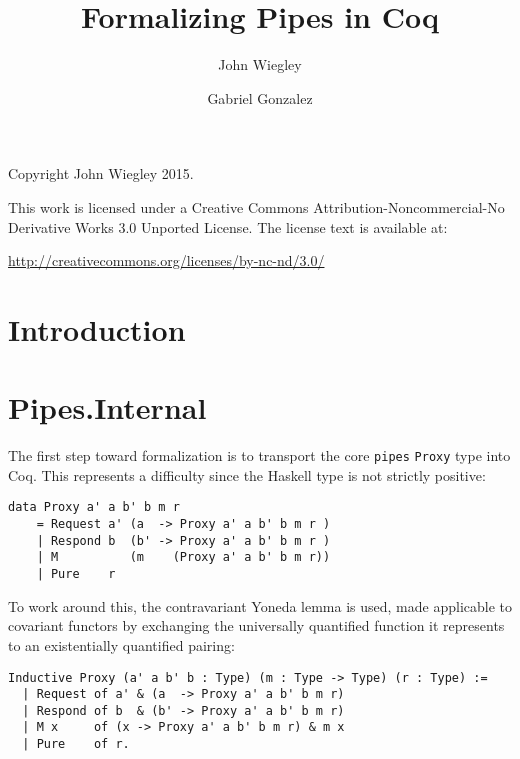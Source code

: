 \documentclass[12pt]{article}
\title{Formalizing Pipes in Coq}
\author{John Wiegley \and Gabriel Gonzalez}
\newcommand{\pipes}{\texttt{pipes}}
\begin{document}
\setlength{\parskip}{0.5ex}
\maketitle

\thispagestyle{empty}
\mbox{}\vfill
\begin{center}

Copyright John Wiegley 2015.


This work is licensed under a
Creative Commons Attribution-Noncommercial-No Derivative Works 3.0
Unported License.
The license text is available at:

\end{center}

\begin{center} \url{http://creativecommons.org/licenses/by-nc-nd/3.0/} \end{center}

\tableofcontents

\section{Introduction}

%

\section{Pipes.Internal}

The first step toward formalization is to transport the core \pipes{}
\verb|Proxy| type into Coq.  This represents a difficulty since the Haskell
type is not strictly positive:

\begin{adjustwidth}{2em}{}
\begin{verbatim}
data Proxy a' a b' b m r
    = Request a' (a  -> Proxy a' a b' b m r )
    | Respond b  (b' -> Proxy a' a b' b m r )
    | M          (m    (Proxy a' a b' b m r))
    | Pure    r
\end{verbatim}
\end{adjustwidth}

To work around this, the contravariant Yoneda lemma is used, made applicable
to covariant functors by exchanging the universally quantified function it
represents to an existentially quantified pairing:

\begin{adjustwidth}{2em}{}
\begin{verbatim}
Inductive Proxy (a' a b' b : Type) (m : Type -> Type) (r : Type) :=
  | Request of a' & (a  -> Proxy a' a b' b m r)
  | Respond of b  & (b' -> Proxy a' a b' b m r)
  | M x     of (x -> Proxy a' a b' b m r) & m x
  | Pure    of r.
\end{verbatim}
\end{adjustwidth}
\end{document}
